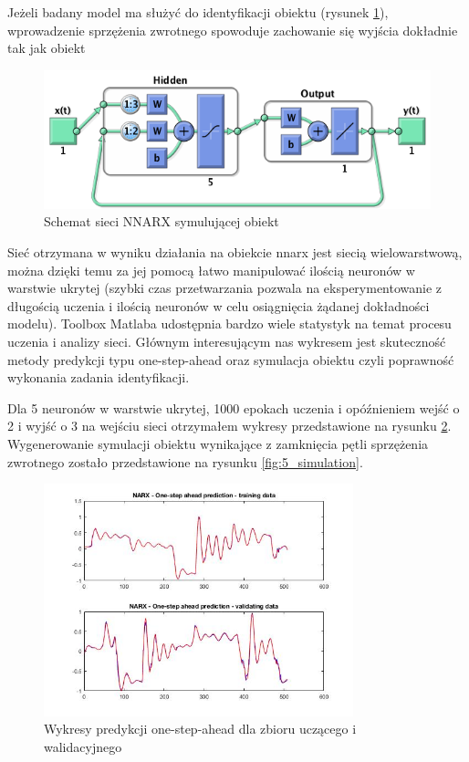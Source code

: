 \documentclass{article}
\begin{document}
Jeżeli badany model ma służyć do identyfikacji obiektu (rysunek \ref{fig:closed}), wprowadzenie sprzężenia
zwrotnego spowoduje zachowanie się wyjścia dokładnie tak jak obiekt

\begin{figure}[H]
\centering
	\includegraphics[width=\textwidth]{closed.png}
\caption{Schemat sieci NNARX symulującej obiekt}
		\label{fig:closed}
\end{figure}

Sieć otrzymana w wyniku działania na obiekcie nnarx jest siecią wielowarstwową,
można dzięki temu za jej pomocą łatwo manipulować ilością neuronów w warstwie ukrytej
(szybki czas przetwarzania pozwala na eksperymentowanie z długością uczenia i ilością neuronów
w celu osiągnięcia żądanej dokładności modelu).
Toolbox Matlaba udostępnia bardzo wiele statystyk na temat procesu uczenia i analizy sieci.
Głównym interesującym nas wykresem jest skuteczność metody predykcji typu one-step-ahead
oraz symulacja obiektu czyli poprawność wykonania zadania identyfikacji.

\newpage
Dla 5 neuronów w warstwie ukrytej, 1000 epokach uczenia i opóźnieniem
wejść o 2 i wyjść o 3 na wejściu sieci otrzymałem wykresy przedstawione
na rysunku \ref{fig:5_one_step_ahead}.
Wygenerowanie symulacji obiektu wynikające z zamknięcia pętli sprzężenia zwrotnego
zostało przedstawione na rysunku \ref{fig:5_simulation}.

\begin{figure}[H]
\centering
	\includegraphics[width=0.80\textwidth,keepaspectratio]{5_one_step_ahead.jpg}
\caption{Wykresy predykcji one-step-ahead dla zbioru uczącego i walidacyjnego}
		\label{fig:5_one_step_ahead}
\end{figure}
\end{document}

